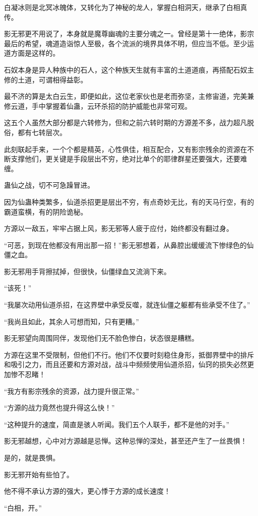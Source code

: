 \begin{this_body}
白凝冰则是北冥冰魄体，又转化为了神秘的龙人，掌握白相洞天，继承了白相真传。

影无邪更不用说了，本身就是魔尊幽魂的主要分魂之一。曾经是第十一绝体，影宗最后的希望，魂道造诣惊人至极，各个流派的境界具体不明，但应当不低。至少运道方面是这样的。

石奴本身是异人种族中的石人，这个种族天生就有丰富的土道道痕，再搭配石奴主修的土道，可谓相得益彰。

最不济的算是太白云生，即便如此，这位老家伙也是老而弥坚，主修宙道，完美兼修云道，手中掌握着仙蛊，云环杀招的防护威能也非常可观。

这五个人虽然大部分都是六转修为，但和之前六转时期的方源差不多，战力超凡脱俗，都有七转层次。

此刻联起手来，一个个都是精英，心性俱佳，相互配合，又有影宗残余的资源在不断支撑他们，更关键是手段层出不穷，绝对比单个的耶律群星还要强大，还要难缠。

蛊仙之战，切不可急躁冒进。

因为仙蛊种类繁多，仙道杀招更是层出不穷，有点奇妙无比，有的天马行空，有的霸道蛮横，有的阴险诡秘。

方源以一敌五，牢牢占据上风，影无邪等人疲于应付，始终都没有翻过身。

“可恶，到现在他都没有用出那一招！”影无邪想着，从鼻腔出缓缓流下惨绿色的仙僵之血。

影无邪用手背擦拭掉，但很快，仙僵绿血又流淌下来。

“该死！”

“我屡次动用仙道杀招，在这界壁中承受反噬，就连仙僵之躯都有些承受不住了。”

“我尚且如此，其余人可想而知，只有更糟。”

影无邪望向周围同伴，发现他们无不脸色惨白，状态很是糟糕。

方源在这里不受限制，但他们不行。他们不仅要时刻稳住身形，抵御界壁中的排斥和吸引之力，而且还要和方源对战，战斗中频频使用仙道杀招，仙窍的损失必然更加惨不忍睹！

“我方有影宗残余的资源，战力提升很正常。”

“方源的战力竟然也提升得这么快！”

“这种提升的速度，简直是骇人听闻。我们五个人联手，都不是他的对手。”

影无邪越想，心中对方源越是忌惮。这种忌惮的深处，甚至还产生了一丝畏惧！

是的，就是畏惧。

影无邪开始有些怕了。

他不得不承认方源的强大，更心悸于方源的成长速度！

“白相，开。”


\end{this_body}
